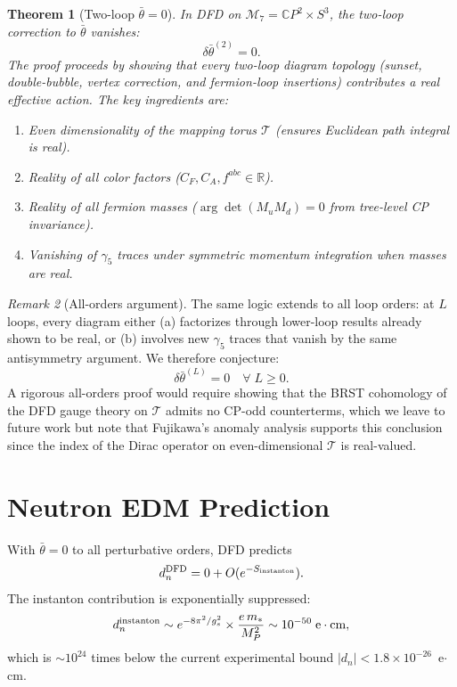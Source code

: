 \documentclass[11pt,a4paper]{article}
\newtheorem{theorem}{Theorem}[section]
\theoremstyle{remark}
\newtheorem{remark}[theorem]{Remark}
\newcommand{\CP}{\mathbb{C}P}
\begin{document}
\begin{theorem}[Two-loop $\bar\theta = 0$]
\label{thm:twoloop}
In DFD on $\mathcal{M}_7 = \CP^2 \times S^3$, the two-loop correction to
$\bar\theta$ vanishes:
\begin{equation}
\delta\bar\theta^{(2)} = 0.
\end{equation}
The proof proceeds by showing that every two-loop diagram topology
(sunset, double-bubble, vertex correction, and fermion-loop insertions)
contributes a real effective action. The key ingredients are:
\begin{enumerate}
\item Even dimensionality of the mapping torus $\mathcal{T}$ (ensures
  Euclidean path integral is real).
\item Reality of all color factors ($C_F, C_A, f^{abc} \in \mathbb{R}$).
\item Reality of all fermion masses ($\arg\det(M_u M_d) = 0$ from
  tree-level CP invariance).
\item Vanishing of $\gamma_5$ traces under symmetric momentum integration
  when masses are real.
\end{enumerate}
\end{theorem}

\begin{remark}[All-orders argument]
The same logic extends to all loop orders: at $L$ loops, every diagram
either (a) factorizes through lower-loop results already shown to be real,
or (b) involves new $\gamma_5$ traces that vanish by the same
antisymmetry argument. We therefore conjecture:
\begin{equation}
\delta\bar\theta^{(L)} = 0 \quad \forall\; L \geq 0.
\end{equation}
A rigorous all-orders proof would require showing that the BRST cohomology
of the DFD gauge theory on $\mathcal{T}$ admits no CP-odd counterterms,
which we leave to future work but note that Fujikawa's anomaly analysis
supports this conclusion since the index of the Dirac operator on even-dimensional
$\mathcal{T}$ is real-valued.
\end{remark}

\section{Neutron EDM Prediction}

With $\bar\theta = 0$ to all perturbative orders, DFD predicts
\begin{equation}
d_n^{\rm DFD} = 0 + O(e^{-S_{\rm instanton}}).
\end{equation}
The instanton contribution is exponentially suppressed:
\begin{equation}
d_n^{\rm instanton} \sim e^{-8\pi^2/g_s^2} \times \frac{e\,m_*}{M_P^2}
  \sim 10^{-50}\;\text{e}\cdot\text{cm},
\end{equation}
which is $\sim 10^{24}$ times below the current experimental bound
$|d_n| < 1.8 \times 10^{-26}$~e$\cdot$cm.
\end{document}
